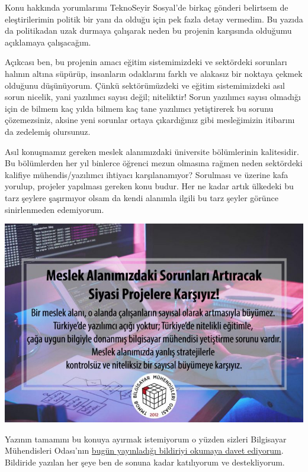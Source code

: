 \documentclass[11pt]{article}
\begin{document}
Konu hakkında yorumlarımı TeknoSeyir Sosyal'de birkaç gönderi belirtsem de
eleştirilerimin politik bir yanı da olduğu için pek fazla detay vermedim. Bu
yazıda da politikadan uzak durmaya çalışarak neden bu projenin karşısında
olduğumu açıklamaya çalışacağım.

Açıkcası ben, bu projenin amacı eğitim sistemimizdeki ve sektördeki sorunları
halının altına süpürüp, insanların odaklarını farklı ve alakasız bir noktaya
çekmek olduğunu düşünüyorum. Çünkü sektörümüzdeki ve eğitim sistemimizdeki
asıl sorun nicelik, yani yazılımcı sayısı değil; niteliktir! Sorun yazılımcı
sayısı olmadığı için de bilmem kaç yılda bilmem kaç tane yazılımcı
yetiştirerek bu sorunu çözemezsiniz, aksine yeni sorunlar ortaya çıkardığınız
gibi mesleğimizin itibarını da zedelemiş olursunuz.

Asıl konuşmamız gereken meslek alanımızdaki üniversite bölümlerinin
kalitesidir. Bu bölümlerden her yıl binlerce öğrenci mezun olmasına rağmen
neden sektördeki kalifiye mühendis/yazılımcı ihtiyacı karşılanamıyor?
Sorulması ve üzerine kafa yorulup, projeler yapılması gereken konu budur. Her
ne kadar artık ülkedeki bu tarz şeylere şaşırmıyor olsam da kendi alanımla
ilgili bu tarz şeyler görünce sinirlenmeden edemiyorum.

\begin{center}
\includegraphics[width=.9\linewidth]{gorseller/bmo-bildiri.jpg}
\end{center}

Yazının tamamını bu konuya ayırmak istemiyorum o yüzden sizleri Bilgisayar
Mühendisleri Odası'nın \href{https://www.bmo.org.tr/2020/04/26/meslek-alanimizdaki-sorunlari-artiracak-siyasi-projelere-karsiyiz/}{bugün yayınladığı bildiriyi okumaya davet ediyorum}.
Bildiride yazılan her şeye ben de sonuna kadar katılıyorum ve destekliyorum.
\end{document}
